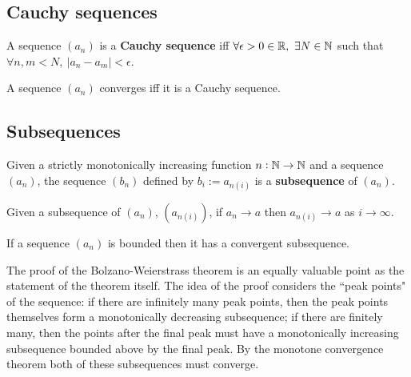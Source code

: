 \documentclass[../Year1/Year1.tex]{subfiles}
\begin{document}
\subsection{Cauchy sequences}

\begin{definition}
   A sequence $(a_n)$ is a \textbf{Cauchy sequence} iff $\forall \epsilon>0\in\mathbb{R}, \ \exists N\in\mathbb{N}$ such that $\forall n,m<N, \ |a_n-a_m|<\epsilon$.
\end{definition}

\begin{theorem}
    A sequence $(a_n)$ converges iff it is a Cauchy sequence.
\end{theorem}

\subsection{Subsequences}

\begin{definition}[Subsequence]
    Given a strictly monotonically increasing function $n:\mathbb{N}\rightarrow\mathbb{N}$ and a sequence $(a_n)$, the  sequence $(b_n)$ defined by $b_i:=a_{n(i)}$ is a \textbf{subsequence} of $(a_n)$.
\end{definition}

\begin{theorem}
    Given a subsequence of $(a_n)$, $(a_{n(i)})$, if $a_n\rightarrow a$ then $a_{n(i)}\rightarrow a$ as $i\rightarrow\infty$.
\end{theorem}

\begin{theorem}
    If a sequence $(a_n)$ is bounded then it has a convergent subsequence.
\end{theorem}

\begin{note}
    The proof of the Bolzano-Weierstrass theorem is an equally valuable point as the statement of the theorem itself. The idea of the proof considers the ``peak points" of the sequence: if there are infinitely many peak points, then the peak points themselves form a monotonically decreasing subsequence; if there are finitely many, then the points after the final peak must have a monotonically increasing subsequence bounded above by the final peak. By the monotone convergence theorem both of these subsequences must converge.
\end{note}
\end{document}
